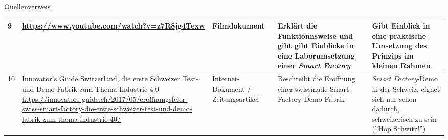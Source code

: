 \documentclass{article}
\def\SmartFactory{\textcolor{DarkestGray}{\textit{Smart Factory}}}
\begin{document}
\begin{Map}{Quellenverweis}
{\begin{tabular}{p{0.2cm}p{4.2cm}p{2cm}p{3.2cm}p{3.2cm}}
 9& 
 \url{https://www.youtube.com/watch?v=z7R8jg4Texw} &
 Filmdokument & 
 Erklärt die Funktionnsweise und gibt gibt Einblicke in eine Laborumsetzung einer \SmartFactory & 
 Gibt Einblick in eine praktische Umsetzung des Prinzips im kleinen Rahmen\\\midrule
 
10&
Innovator's Guide Switzerland, die erste Schweizer Test- und Demo-Fabrik zum Thema Industrie 4.0 \url{https://innovators-guide.ch/2017/05/eroffnungsfeier-swiss-smart-factory-die-erste-schweizer-test-und-demo-fabrik-zum-thema-industrie-40/} &
Internet-Dokument / Zeitungsartikel & 
Beschreibt die Eröffnung einer swissmade Smart Factory Demo-Fabrik & 
\SmartFactory -Demo in der Schweiz, eignet sich nur schon dadurch, schweizerisch zu sein (''Hop Schwitz!'') \\\bottomrule
\end{tabular}}

\end{Map}
\end{document}
